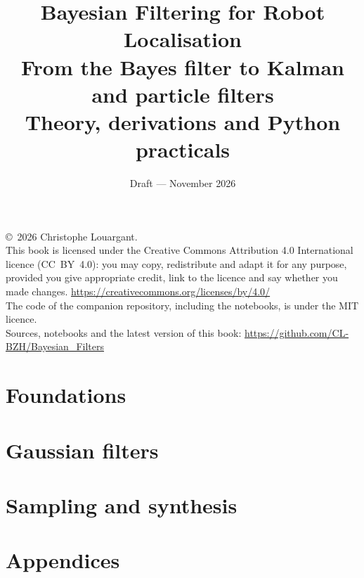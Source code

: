 \documentclass[11pt,oneside]{book}
\title{\textbf{Bayesian Filtering for Robot Localisation}\\[0.5em]
  \large From the Bayes filter to Kalman and particle filters\\
  \large Theory, derivations and Python practicals}
\author{}
\date{Draft --- November 2026}
\begin{document}
\frontmatter
\maketitle

\thispagestyle{empty}
\vspace*{\fill}
\noindent\small
\copyright\ 2026 Christophe Louargant.\\[0.5em]
This book is licensed under the Creative Commons Attribution 4.0
International licence (CC~BY~4.0): you may copy, redistribute and adapt it
for any purpose, provided you give appropriate credit, link to the licence
and say whether you made changes.
\url{https://creativecommons.org/licenses/by/4.0/}\\[0.5em]
The code of the companion repository, including the notebooks, is under
the MIT licence.\\[0.5em]
Sources, notebooks and the latest version of this book:
\url{https://github.com/CL-BZH/Bayesian_Filters}
\normalsize
\clearpage

\tableofcontents

\mainmatter

\part{Foundations}


\part{Gaussian filters}



\part{Sampling and synthesis}



\appendix
\cleardoublepage{}
{}
\part*{Appendices}







\backmatter

\end{document}
